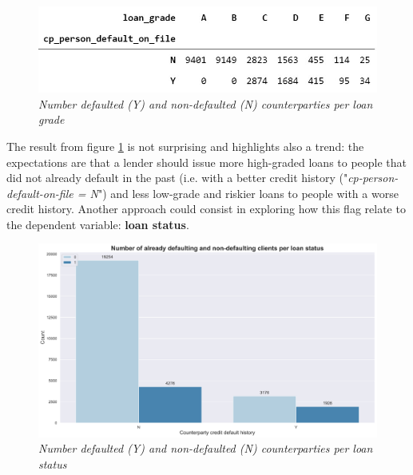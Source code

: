 \documentclass[a4paper,12pt]{article}
\begin{document}
        \begin{figure}[H]
            \centerline{
                \includegraphics[width=\linewidth]{./images/loans_ct_grades_credit_history.jpg}
            }
            \caption{\textit{Number defaulted (Y) and non-defaulted (N) counterparties per loan grade}}
            \label{fig:tab_defaults_grade}
        \end{figure}

    The result from figure \ref{fig:tab_defaults_grade} is not surprising and highlights also a trend: 
    the expectations are that a lender should issue more high-graded loans to people that did not already default in the past 
    (i.e. with a better credit history ("\textit{cp-person-default-on-file = N}") and less low-grade and riskier loans to people with a worse credit history. 
    Another approach could consist in exploring how this flag relate to the dependent variable: \textbf{loan status}.

        \begin{figure}[H]
            \centerline{
                \includegraphics[width=\linewidth]{./images/loans_status_credit_history.png}
            }
            \caption{\textit{Number defaulted (Y) and non-defaulted (N) counterparties per loan status}}
            \label{fig:hist_status_credit_history}
        \end{figure}
    
\end{document}
